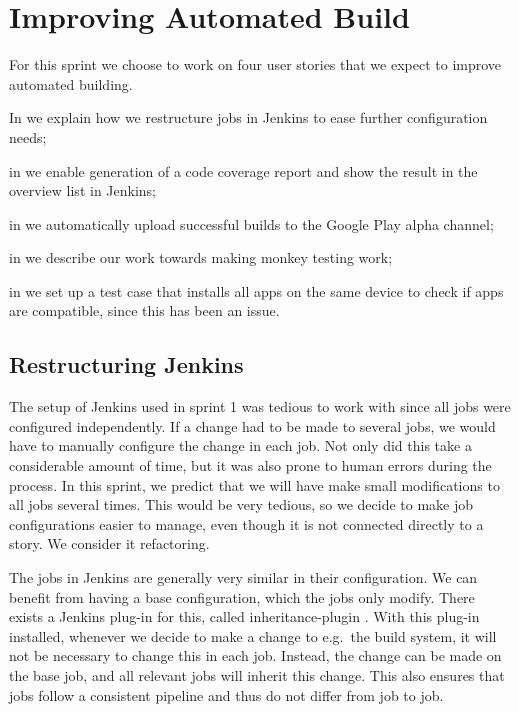 \chapter{Improving Automated Build}
For this sprint we choose to work on four user stories that we expect to improve automated building.

\begin{chapterorganization}
  \item In  we explain how we restructure jobs in Jenkins to ease further configuration needs;
  \item in  we enable generation of a code coverage report and show the result in the overview list in Jenkins;
  \item in  we automatically upload successful builds to the Google Play alpha channel;
  \item in  we describe our work towards making monkey testing work;
  \item in  we set up a test case that installs all apps on the same device to check if apps are compatible, since this has been an issue.
\end{chapterorganization}

\section{Restructuring Jenkins}\label{sec:jenkins_restruct}
The setup of Jenkins used in sprint 1 was tedious to work with since all jobs were configured independently. If a change had to be made to several jobs, we would have to manually configure the change in each job. Not only did this take a considerable amount of time, but it was also prone to human errors during the process. In this sprint, we predict that we will have make small modifications to all jobs several times. This would be very tedious, so we decide to make job configurations easier to manage, even though it is not connected directly to a story. We consider it refactoring.

The jobs in Jenkins are generally very similar in their configuration. We can benefit from having a base configuration, which the jobs only modify. There exists a Jenkins plug-in for this, called inheritance-plugin \parencite{jenkins-inheritance}. With this plug-in installed, whenever we decide to make a change to e.g.\ the build system, it will not be necessary to change this in each job. Instead, the change can be made on the base job, and all relevant jobs will inherit this change. This also ensures that jobs follow a consistent pipeline and thus do not differ from job to job.

